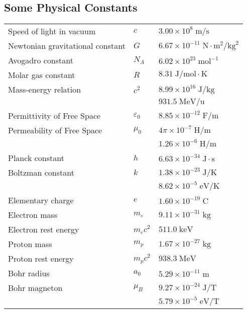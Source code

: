 \documentclass[../PhysicsFormulae.tex]{subfiles}
\begin{document}
\thispagestyle{empty}
\subsection{Some Physical Constants}

\begin{tabular}{l l l}\hline
    Speed of light in vacuum & $c$ & $3.00 \times 10^8 \; \textrm{m/s}$ \\
    Newtonian gravitational constant & $G$ & $6.67 \times 10^{-11} \; \textrm{N} \cdot \textrm{m}^2/\textrm{kg}^2$ \\
    Avogadro constant & $N_A$ & $6.02 \times 10^{23} \; \textrm{mol}^{-1}$ \\
    Molar gas constant & $R$ & $8.31 \; \textrm{J/mol} \cdot \textrm{K}$ \\
    Mass-energy relation & $c^2$ & $8.99 \times 10^{16} \; \textrm{J/kg}$ \\
    && $931.5 \; \textrm{MeV/u}$ \\
    Permittivity of Free Space & $\varepsilon_0$ & $8.85 \times 10^{-12} \; \textrm{F/m}$ \\
    Permeability of Free Space & $\mu_0$ & $4\pi \times 10^{-7} \; \textrm{H/m}$ \\
    && $1.26 \times 10^{-6} \; \textrm{H/m}$ \\
    Planck constant & $h$ & $6.63 \times 10^{-34} \; \textrm{J} \cdot \textrm{s}$ \\
    Boltzman constant & $k$ & $1.38 \times 10^{-23} \; \textrm{J/K}$ \\
    && $8.62 \times 10^{-5} \; \textrm{eV/K}$ \\
    Elementary charge & $e$ & $1.60 \times 10^{-19} \; \textrm{C}$ \\
    Electron mass & $m_e$ & $9.11 \times 10^{-31} \; \textrm{kg}$ \\
    Electron rest energy & $m_ec^2$ & $511.0 \; \textrm{keV}$ \\
    Proton mass & $m_p$ & $1.67 \times 10^{-27} \; \textrm{kg}$ \\
    Proton rest energy & $m_pc^2$ & $938.3 \; \textrm{MeV}$ \\
    Bohr radius & $a_0$ & $5.29 \times 10^{-11} \; \textrm{m}$\\
    Bohr magneton & $\mu_B$ & $9.27 \times 10^{-24} \; \textrm{J/T}$\\
    && $5.79 \times 10^{-5} \; \textrm{eV/T}$\\
\end{tabular}
\end{document}
